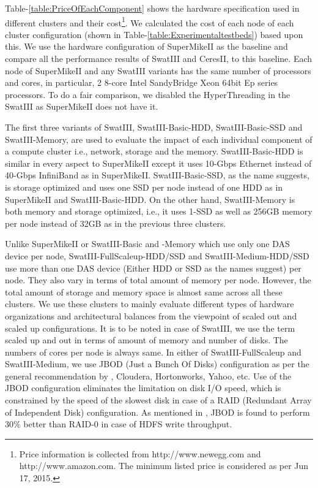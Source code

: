 \documentclass[conference]{IEEEtran}
\begin{document}
Table-\ref{table:PriceOfEachComponent} shows the hardware specification used in different clusters and their cost\footnote{Price information is collected from http://www.newegg.com and http://www.amazon.com. The minimum listed price is considered as per Jun 17, 2015.}. We calculated the cost of each node of each cluster configuration (shown in Table-\ref{table:Experimentaltestbeds}) based upon  this.
We use the hardware configuration of SuperMikeII as the baseline and compare all the performance results of SwatIII and CeresII, to this baseline. 
Each node of SuperMikeII and any SwatIII variants has the same number of processors and cores, in particular, 2 8-core Intel SandyBridge Xeon 64bit Ep series processors. 
To do a fair comparison, we disabled the HyperThreading in the SwatIII as SuperMikeII does not have it. 
 
The first three variants of SwatIII, SwatIII-Basic-HDD, SwatIII-Basic-SSD and SwatIII-Memory, are used to evaluate the impact of each individual component of a compute cluster i.e., network, storage and the memory. 
SwatIII-Basic-HDD is similar in every aspect to SuperMikeII except it uses 10-Gbps Ethernet instead of 40-Gbps InfiniBand as in SuperMikeII. 
SwatIII-Basic-SSD, as the name suggests, is storage optimized and uses one SSD per node instead of one HDD as in SuperMikeII and SwatIII-Basic-HDD.
On the other hand, SwatIII-Memory is both memory and storage optimized, i.e., it uses 1-SSD as well as 256GB memory per node instead of 32GB as in the previous three clusters. 

Unlike SuperMikeII or SwatIII-Basic and -Memory which use only one DAS device per node, SwatIII-FullScaleup-HDD/SSD and SwatIII-Medium-HDD/SSD use more than one DAS device (Either HDD or SSD as the names suggest) per node. 
They also vary in terms of total amount of memory per node.
However, the total amount of storage and memory space is almost same across all these clusters. 
We use these clusters to mainly evaluate different types of hardware organizations and architectural balances from the viewpoint of scaled out and scaled up configurations. 
It is to be noted in case of SwatIII, we use the term scaled up and out in terms of amount of memory and number of disks. The numbers of cores per node is always same. 
In either of SwatIII-FullScaleup and SwatIII-Medium, we use JBOD (Just a Bunch Of Disks) configuration as per the general recommendation by \cite{fw:hadoop}, Cloudera, Hortonworks, Yahoo, etc. 
Use of the JBOD configuration eliminates the limitation on disk I/O speed, which is constrained by the speed of the slowest disk in case of a RAID (Redundant Array of Independent Disk) configuration. 
As mentioned in \cite{fw:hadoop}, JBOD is found to perform 30\% better than RAID-0 in case of HDFS write throughput. 
\end{document}
